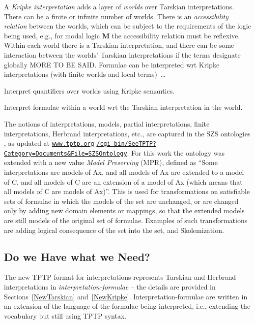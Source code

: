 \documentclass{easychair}
\newenvironment{packed_itemize}{
\vspace*{-0.3em}
\begin{itemize}
\setlength{\partopsep}{0pt}
\setlength{\itemsep}{1pt}
\setlength{\parskip}{0pt}
\setlength{\parsep}{0pt}
}{\end{itemize}}
\begin{document}
A {\em Kripke interpretation} \cite{Kri63} adds a layer of {\em worlds} over Tarskian 
interpretations.
There can be a finite or infinite number of worlds.
There is an {\em accessibility relation} between the worlds, which can be subject to the
requirements of the logic being used, e.g., for modal logic {\bf M} the accessibility 
relation must be reflexive.
Within each world there is a Tarskian interpretation, and there can be some interaction
between the worlds' Tarskian interpretations if the terms designate globally MORE TO BE SAID.
Formulae can be interpreted wrt Kripke interpretations (with finite worlds and local terms)~\ldots
\begin{packed_itemize}
\item Interpret quantifiers over worlds using Kripke semantics.
\item Interpret formulae within a world wrt the Tarskian interpretation in the world.
\end{packed_itemize}

The notions of interpretations, models, partial interpretations, finite interpretations,
Herbrand interpretations, etc., are captured in the SZS ontologies \cite{Sut08-KEAPPA}, as
updated at 
\href{https://www.tptp.org/cgi-bin/SeeTPTP?Category=Documents\&File=SZSOntology}{\tt www.tptp.org}
\href{https://www.tptp.org/cgi-bin/SeeTPTP?Category=Documents\&File=SZSOntology}{\tt /cgi-bin/SeeTPTP?Category=Documents\&File=SZSOntology}.
For this work the ontology was extended with a new value {\em Model Preserving} (MPR), defined
as ``Some interpretations are models of Ax, and
  all models of Ax are extended to a model of C, and
  all models of C are an extension of a model of Ax
  (which means that all models of C are models of Ax)''.
This is used for transformations on satisfiable sets of formulae in which the models of the set 
are unchanged, or are changed only by adding new domain elements or mappings, so that the
extended models are still models of the original set of formulae. 
Examples of such transformations are adding logical consequence of the set into the set, and
Skolemization.

\subsection{Do we Have what we Need?}
\label{HaveNeed}

The new TPTP format for interpretations represents Tarskian and Herbrand interpretations in 
{\em interpretation-formulae} -- the details are provided in Sections~\ref{NewTarskian} 
and~\ref{NewKripke}.
Interpretation-formulae are written in an extension of the language of the formulae being 
interpreted, i.e., extending the vocabulary but still using TPTP syntax.
\end{document}
